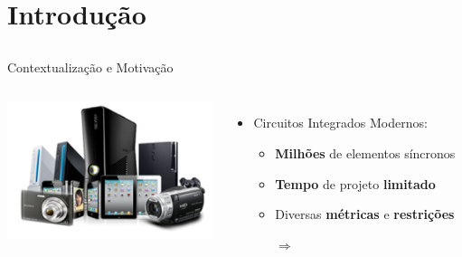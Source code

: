 \section{Introdução}
\subsection*{}


\begin{frame}{Contextualização e Motivação}

\hspace*{-2cm}
\begin{columns}[c]
\includegraphics[height=4cm, keepaspectratio,left]{img/introducao/equip_conj_008.png}


    \begin{itemize}
        \vspace{8pt} 
        \item Circuitos Integrados Modernos:
        \begin{itemize}
            \itemsep8pt 
            \item \textbf{Milhões} de elementos síncronos 
            \item \textbf{Tempo} de projeto \textbf{limitado}
            \item Diversas \textbf{métricas} e \textbf{restrições}
            \item[$\Rightarrow$] 
        \end{itemize}
    \end{itemize}

\end{columns}

\end{frame}

